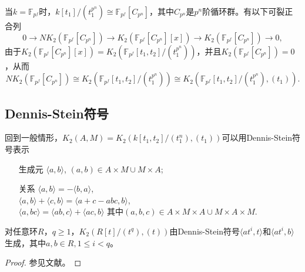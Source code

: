 当$k=\mathbb{F}_{p^f}$时，$k[t_1]/(t_1^{p^n})\cong \mathbb{F}_{p^f}[C_{p^n}]$，其中$C_{p^n}$是$p^n$阶循环群。有以下可裂正合列
\[0\longrightarrow NK_2(\mathbb{F}_{p^f}[C_{p^n}]) \longrightarrow K_2(\mathbb{F}_{p^f}[C_{p^n}][x])\longrightarrow K_2(\mathbb{F}_{p^f}[C_{p^n}]) \longrightarrow 0,\]
由于$K_2(\mathbb{F}_{p^f}[C_{p^n}][x])=K_2(\mathbb{F}_{p^f}[t_1,t_2]/(t_1^{p^n}))$，并且$K_2(\mathbb{F}_{p^f}[C_{p^n}])=0$，从而
\[NK_2(\mathbb{F}_{p^f}[C_{p^n}])\cong K_2(\mathbb{F}_{p^f}[t_1,t_2]/(t_1^{p^n})) \cong K_2(\mathbb{F}_{p^f}[t_1,t_2]/(t_1^{p^n}),(t_1)).\]


\subsection{Dennis-Stein符号}
\label{sub:dennis_stein_symbols}
回到一般情形，$K_2(A,M)=K_2(k[t_1,t_2]/(t_1^n),(t_1))$可以用Dennis-Stein符号表示

\begin{itemize}
	\item[生成元]   $\langle a,b \rangle $, $(a,b)\in A\times M \cup M \times A$;
	\item[关系] $\langle a,b\rangle = -\langle b,a \rangle$, \\
	$\langle a,b\rangle +\langle c,b \rangle=\langle a+c-abc,b\rangle$, \\
	 $\langle a,bc\rangle =\langle ab,c\rangle +\langle ac,b\rangle$ 其中$(a,b,c)\in A\times M \times A \cup M\times A\times M$.
\end{itemize}

\begin{prop}
	对任意环$R$，$q\geq 1$，$K_2(R[t]/(t^q),(t))$由Dennis-Stein符号$\langle at^i,t\rangle$和$\langle at^i,b\rangle$生成，其中$a,b\in R, 1\leq i<q$。
\end{prop}
\begin{proof}
	参见文献\cite{MR82k:13016}。
\end{proof}

